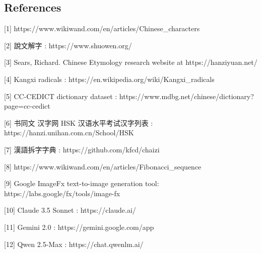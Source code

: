 \subsection{References}\label{references}

{[}1{]} https://www.wikiwand.com/en/articles/Chinese\_characters

{[}2{]} 說文解字 : https://www.shuowen.org/

{[}3{]} Sears, Richard. Chinese Etymology research website at
https://hanziyuan.net/

{[}4{]} Kangxi radicals : https://en.wikipedia.org/wiki/Kangxi\_radicals

{[}5{]} CC-CEDICT dictionary dataset :
https://www.mdbg.net/chinese/dictionary?page=cc-cedict

{[}6{]} 书同文 汉字网 HSK 汉语水平考试汉字列表 :
https://hanzi.unihan.com.cn/School/HSK

{[}7{]} 漢語拆字字典 : https://github.com/kfcd/chaizi

{[}8{]} https://www.wikiwand.com/en/articles/Fibonacci\_sequence

{[}9{]} Google ImageFx text-to-image generation tool:
https://labs.google/fx/tools/image-fx

{[}10{]} Claude 3.5 Sonnet : https://claude.ai/

{[}11{]} Gemini 2.0 : https://gemini.google.com/app

{[}12{]} Qwen 2.5-Max : https://chat.qwenlm.ai/
